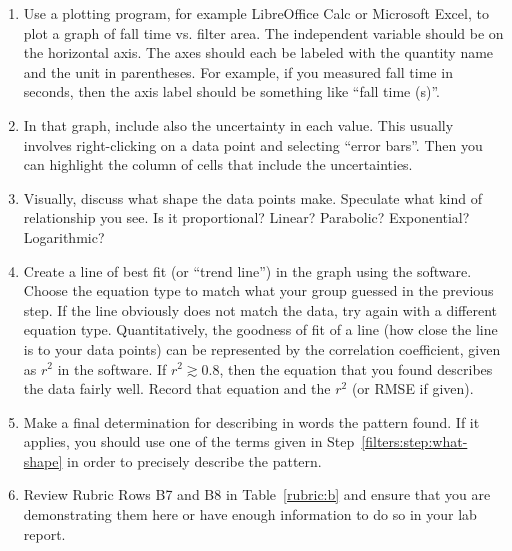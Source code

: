 \begin{enumerate}
	\item Use a plotting program, for example LibreOffice Calc or Microsoft Excel, to plot a graph of fall time vs. filter area. The independent variable should be on the horizontal axis. The axes should each be labeled with the quantity name and the unit in parentheses. For example, if you measured fall time in seconds, then the axis label should be something like ``fall time (s)''.
	
	\item In that graph, include also the uncertainty in each value. This usually involves right-clicking on a data point and selecting ``error bars''. Then you can highlight the column of cells that include the uncertainties.
	
	\item\label{filters:step:what-shape} Visually, discuss what shape the data points make. Speculate what kind of relationship you see. Is it proportional? Linear? Parabolic? Exponential? Logarithmic?
	
	\item Create a line of best fit (or ``trend line'') in the graph using the software. Choose the equation type to match what your group guessed in the previous step. If the line obviously does not match the data, try again with a different equation type. Quantitatively, the goodness of fit of a line (how close the line is to your data points) can be represented by the correlation coefficient, given as $r^2$ in the software. If $r^2 \gtrsim 0.8$, then the equation that you found describes the data fairly well. Record that equation and the $r^2$ (or RMSE if given).
	
	\item Make a final determination for describing in words the pattern found. If it applies, you should use one of the terms given in Step~\ref{filters:step:what-shape} in order to precisely describe the pattern.
	
	\item Review Rubric Rows B7 and B8 in Table~\ref{rubric:b} and ensure that you are demonstrating them here or have enough information to do so in your lab report.
\end{enumerate}

%

